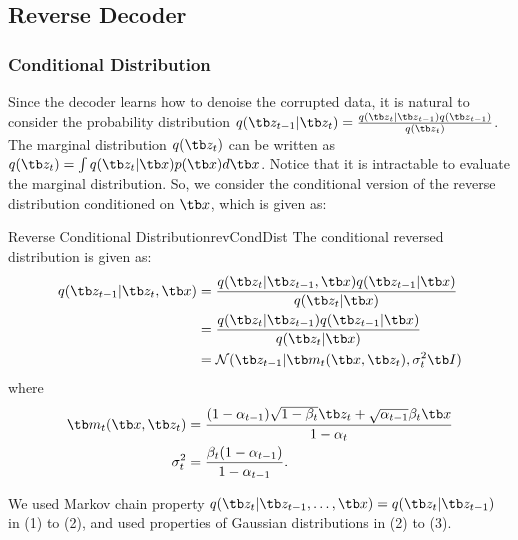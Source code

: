 \documentclass{article}
\begin{document}
    \subsection{Reverse Decoder}
        \subsubsection{Conditional Distribution}
            Since the decoder learns how to denoise the corrupted data, it is natural to consider the probability distribution $q(\tb z_{t-1}|\tb z_t)=\frac{q(\tb z_t|\tb z_{t-1})q(\tb z_{t-1})}{q(\tb z_t)}$.
            The marginal distribution $q(\tb z_t)$ can be written as $q(\tb z_t)=\int q(\tb z_t|\tb x)p(\tb x)d\tb x$. Notice that it is intractable to evaluate the marginal distribution. So, we consider the conditional
            version of the reverse distribution conditioned on $\tb x$, which is given as:
            \begin{thm}{Reverse Conditional Distribution}{revCondDist}
                The conditional reversed distribution is given as:
                \begin{align}
                q(\tb z_{t-1}|\tb z_t, \tb x)&=\frac{q(\tb z_t|\tb z_{t-1},\tb x)q(\tb z_{t-1}|\tb x)}{q(\tb z_t|\tb x)}
                \\ &=\frac{q(\tb z_t|\tb z_{t-1})q(\tb z_{t-1}|\tb x)}{q(\tb z_t|\tb x)}
                \\ &=\mathcal{N}(\tb z_{t-1}|\tb m_t(\tb x, \tb z_t), \sigma_t^2\tb I)
                \end{align}
                where
                \begin{align*}
                    \tb m_t(\tb x, \tb z_t)&=\frac{(1-\alpha_{t-1})\sqrt{1-\beta_t}\tb z_t + \sqrt{\alpha_{t-1}}\beta_t\tb x}{1-\alpha_t}
                \\  \sigma_t^2&=\frac{\beta_t(1-\alpha_{t-1})}{1-\alpha_{t-1}}.
                \end{align*}
            \end{thm}
                We used Markov chain property $q(\tb z_t|\tb z_{t-1},\dots,\tb x) = q(\tb z_t|\tb z_{t-1})$ in (1) to (2), and used properties of Gaussian distributions in (2) to (3).
\end{document}
